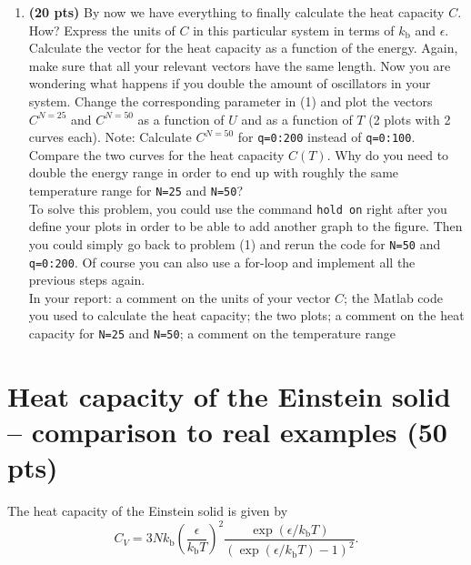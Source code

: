 \documentclass[11pt]{article}
\begin{document}
\begin{enumerate}[resume]
\item \textbf{(20 pts)} By now we have everything to finally calculate the heat capacity $C$. How? Express the units of $C$ in this particular system in terms of $k_\mathrm{b}$ and $\epsilon$. Calculate the vector for the heat capacity as a function of the energy. Again, make sure that all your relevant vectors have the same length. Now you are wondering what happens if you double the amount of oscillators in your system. Change the corresponding parameter in (1) and plot the vectors $C^{N=25}$ and $C^{N=50}$ as a function of $U$ and as a function of $T$ (2 plots with 2 curves each). {\color{red}Note:} Calculate $C^{N=50}$ for \verb|q=0:200| instead of \verb|q=0:100|. Compare the two curves for the heat capacity $C(T)$. Why do you need to double the energy range in order to end up with roughly the same temperature range for \verb|N=25| and \verb|N=50|?\\
To solve this problem, you could use the command {\color{red}\verb|hold on|} right after you define your plots in order to be able to add another graph to the figure. Then you could simply go back to problem (1) and rerun the code for \verb|N=50| and \verb|q=0:200|. Of course you can also use a for-loop and implement all the previous steps again.\\
In your report: a comment on the units of your vector $C$; the Matlab code you used to calculate the heat capacity; the two plots; a comment on the heat capacity for \verb|N=25| and \verb|N=50|; a comment on the temperature range

\end{enumerate}

\section*{Heat capacity of the Einstein solid  -- comparison to real examples (50 pts)}
\label{sec:lot}

The heat capacity of the Einstein solid is given by 
\begin{equation}
C_V=3Nk_\mathrm{b}\left(\frac{\epsilon}{k_\mathrm{b}T}\right)^2\frac{\exp\left(\epsilon/k_\mathrm{b}T\right)}{\left(\exp\left(\epsilon/k_\mathrm{b}T\right)-1\right)^2}.
\label{cv_formula}
\end{equation}
\end{document}
